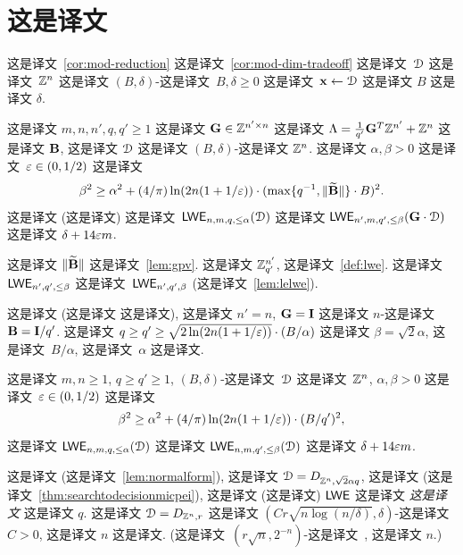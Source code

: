 \section{这是译文}
\label{sec:modexpansion}



这是译文~\ref{cor:mod-reduction} 这是译文~\ref{cor:mod-dim-tradeoff} 这是译文~$\mathcal{D}$ 这是译文~$\mathbb{Z}^{n}$ 这是译文 $(B,\delta)$-这是译文~$B,\delta\geq 0$ 这是译文~$\mathbf{x} \gets
\mathcal{D}$ 这是译文 $B$ 这是译文 $\delta$. 

\begin{theorem}
  \label{thm:mod-dim-switch}  这是译文 $m,n, n',q,q' \geq 1$ 这是译文  $\mathbf{G} \in \mathbb{Z}^{n' \times n}$ 这是译文 $\Lambda =
  \frac{1}{q'} \mathbf{G}^{T} \mathbb{Z}^{n'} + \mathbb{Z}^{n}$ 这是译文 $\mathbf{B}$,  这是译文 $\mathcal{D}$ 这是译文 $(B,\delta)$-这是译文  $\mathbb{Z}^{n}$.  这是译文 $\alpha, \beta > 0$ 这是译文~$\varepsilon \in (0,1/2)$ 这是译文  \[\beta^{2} \geq
  \alpha^{2} + (4/\pi) \ln(2n(1+1/\varepsilon)) \cdot (\max\{q^{-1}, \lVert\widetilde{\mathbf{B}}\rVert\} \cdot B)^{2}.\]  这是译文 (这是译文) 这是译文~$\mathsf{LWE}_{n,m,q,\le \alpha}(\mathcal{D})$ 这是译文 $\mathsf{LWE}_{n',m,q',\leq \beta}(\mathbf{G}
  \cdot \mathcal{D})$ 这是译文 $\delta + 14 \varepsilon m$.
\end{theorem}

这是译文 $\|\widetilde {\mathbf{B}}\|$ 这是译文~\ref{lem:gpv}. 这是译文 $\mathbb{Z}_{q'}^{n'}$, 这是译文~\ref{def:lwe}. 这是译文 $\mathsf{LWE}_{n',q',\leq \beta}$  这是译文~$\mathsf{LWE}_{n',q',\beta}$ (这是译文~\ref{lem:lelwe}).

这是译文 (这是译文 \lwe 这是译文), 这是译文 $n'=n$, $\mathbf{G}=\mathbf{I}$ 这是译文 $n$-这是译文 $\mathbf{B} = \mathbf{I}/q'$.  这是译文 $q \ge q' \ge \sqrt{2\ln(2n(1+1/\varepsilon))} \cdot
(B/\alpha)$ 这是译文 $\beta=\sqrt{2} \alpha$, 这是译文~$B/\alpha$, 这是译文~$\alpha$ 这是译文.

\begin{corollary}
  \label{cor:mod-reduction}  这是译文 $m,n \geq 1$, $q \geq q' \geq 1$, $(B,\delta)$-这是译文~$\mathcal{D}$ 这是译文~$\mathbb{Z}^{n}$, $\alpha,\beta>0$ 这是译文~$\varepsilon \in (0,1/2)$ 这是译文  \[
	\beta^{2} \geq \alpha^{2} + (4/\pi) \ln(2n(1+1/\varepsilon))
  \cdot (B/q')^2,
	\]  这是译文  $\mathsf{LWE}_{n,m,q,\le \alpha}(\mathcal{D})$ 这是译文  $\mathsf{LWE}_{n,m,q',\le \beta}(\mathcal{D})$ 这是译文 $\delta + 14 \varepsilon m$.
\end{corollary}

这是译文 \lwe (这是译文~\ref{lem:normalform}), 这是译文 $\mathcal{D} = D_{\mathbb{Z}^{n}, \sqrt{2} \alpha q}$, 这是译文 (这是译文~\ref{thm:searchtodecisionmicpei}), 这是译文 (这是译文) $\mathsf{LWE}$ 这是译文 \emph{这是译文} 这是译文 $q$. 这是译文 $\mathcal{D} = D_{\mathbb{Z}^{n}, r}$ 这是译文 $(C r \sqrt{n \log(n/\delta)}, \delta)$-这是译文 $C>0$, 这是译文 $n$ 这是译文. (这是译文~$(r\sqrt{n},2^{-n})$-这是译文~\cite[Lemma~1.5]{banaszczyk93:_new}, 这是译文 $n$.)

